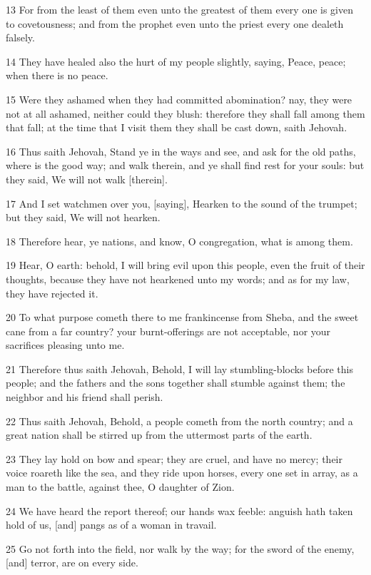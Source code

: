 \par 13 For from the least of them even unto the greatest of them every one is given to covetousness; and from the prophet even unto the priest every one dealeth falsely.
\par 14 They have healed also the hurt of my people slightly, saying, Peace, peace; when there is no peace.
\par 15 Were they ashamed when they had committed abomination? nay, they were not at all ashamed, neither could they blush: therefore they shall fall among them that fall; at the time that I visit them they shall be cast down, saith Jehovah.
\par 16 Thus saith Jehovah, Stand ye in the ways and see, and ask for the old paths, where is the good way; and walk therein, and ye shall find rest for your souls: but they said, We will not walk [therein].
\par 17 And I set watchmen over you, [saying], Hearken to the sound of the trumpet; but they said, We will not hearken.
\par 18 Therefore hear, ye nations, and know, O congregation, what is among them.
\par 19 Hear, O earth: behold, I will bring evil upon this people, even the fruit of their thoughts, because they have not hearkened unto my words; and as for my law, they have rejected it.
\par 20 To what purpose cometh there to me frankincense from Sheba, and the sweet cane from a far country? your burnt-offerings are not acceptable, nor your sacrifices pleasing unto me.
\par 21 Therefore thus saith Jehovah, Behold, I will lay stumbling-blocks before this people; and the fathers and the sons together shall stumble against them; the neighbor and his friend shall perish.
\par 22 Thus saith Jehovah, Behold, a people cometh from the north country; and a great nation shall be stirred up from the uttermost parts of the earth.
\par 23 They lay hold on bow and spear; they are cruel, and have no mercy; their voice roareth like the sea, and they ride upon horses, every one set in array, as a man to the battle, against thee, O daughter of Zion.
\par 24 We have heard the report thereof; our hands wax feeble: anguish hath taken hold of us, [and] pangs as of a woman in travail.
\par 25 Go not forth into the field, nor walk by the way; for the sword of the enemy, [and] terror, are on every side.
